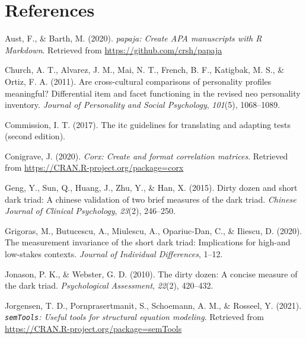 \documentclass[
  english,
  man]{apa6}
\begin{document}
\hypertarget{references}{%
\section{References}\label{references}}

\begingroup
\setlength{\parindent}{-0.5in}
\setlength{\leftskip}{0.5in}

\hypertarget{refs}{}
\leavevmode\hypertarget{ref-R-papaja}{}%
Aust, F., \& Barth, M. (2020). \emph{papaja: Create APA manuscripts with R Markdown}. Retrieved from \url{https://github.com/crsh/papaja}

\leavevmode\hypertarget{ref-church2011cross}{}%
Church, A. T., Alvarez, J. M., Mai, N. T., French, B. F., Katigbak, M. S., \& Ortiz, F. A. (2011). Are cross-cultural comparisons of personality profiles meaningful? Differential item and facet functioning in the revised neo personality inventory. \emph{Journal of Personality and Social Psychology}, \emph{101}(5), 1068--1089.

\leavevmode\hypertarget{ref-itc_2017}{}%
Commission, I. T. (2017). The itc guidelines for translating and adapting tests (second edition).

\leavevmode\hypertarget{ref-R-corx}{}%
Conigrave, J. (2020). \emph{Corx: Create and format correlation matrices}. Retrieved from \url{https://CRAN.R-project.org/package=corx}

\leavevmode\hypertarget{ref-geng2015dirty}{}%
Geng, Y., Sun, Q., Huang, J., Zhu, Y., \& Han, X. (2015). Dirty dozen and short dark triad: A chinese validation of two brief measures of the dark triad. \emph{Chinese Journal of Clinical Psychology}, \emph{23}(2), 246--250.

\leavevmode\hypertarget{ref-grigoras2020measurement}{}%
Grigoras, M., Butucescu, A., Miulescu, A., Opariuc-Dan, C., \& Iliescu, D. (2020). The measurement invariance of the short dark triad: Implications for high-and low-stakes contexts. \emph{Journal of Individual Differences}, 1--12.

\leavevmode\hypertarget{ref-jonason2010dirty}{}%
Jonason, P. K., \& Webster, G. D. (2010). The dirty dozen: A concise measure of the dark triad. \emph{Psychological Assessment}, \emph{22}(2), 420--432.

\leavevmode\hypertarget{ref-R-semTools}{}%
Jorgensen, T. D., Pornprasertmanit, S., Schoemann, A. M., \& Rosseel, Y. (2021). \emph{\texttt{semTools}: Useful tools for structural equation modeling}. Retrieved from \url{https://CRAN.R-project.org/package=semTools}
\end{document}
